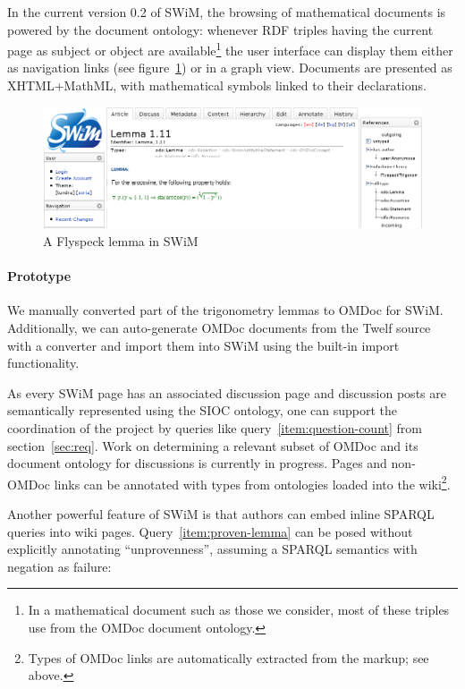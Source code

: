 In the current version 0.2 of SWiM, the browsing of mathematical documents is
powered by the document ontology: whenever RDF triples having the current page
as subject or object are available\footnote{In a mathematical document such as
  those we consider, most of these triples use from the OMDoc document
  ontology.} the  user interface can display them either as
navigation links (see figure~\ref{fig:swim-lemma}) or in a graph view.
Documents are presented as XHTML+MathML, with mathematical symbols linked to
their declarations.

\begin{figure}
  \centering
  \includegraphics[width=\textwidth]{images/swim-lemma}
  \caption{A Flyspeck lemma in SWiM}
  \label{fig:swim-lemma}
\end{figure}

\paragraph{Prototype} We manually converted part of the trigonometry lemmas to
OMDoc for SWiM.  Additionally, we can auto-generate OMDoc documents from the
Twelf source with a converter and import them into SWiM using the built-in
import functionality.

As every SWiM page has an associated discussion page and discussion posts are
semantically represented using the SIOC ontology\cite{SIOC:web}, one can support
the coordination of the project by queries like query~\ref{item:question-count}
from section~\ref{sec:req}.  Work on determining a relevant subset of OMDoc and
its document ontology for discussions is currently in progress.  Pages and non-OMDoc
links can be annotated with types from ontologies loaded into the
wiki\footnote{Types of OMDoc links are automatically extracted from the markup;
  see above.}.

Another powerful feature of SWiM is that authors can embed inline SPARQL queries
into wiki pages.  Query~\ref{item:proven-lemma} can be posed without explicitly
annotating ``unprovenness'', assuming a SPARQL semantics with negation as
failure\cite{Polleres:SPARQL-Rules07}:

